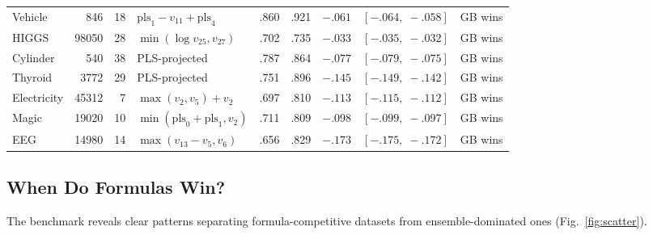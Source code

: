 \documentclass[journal]{IEEEtran}
\begin{document}
\begin{table}[t]
\begin{tabular}{@{}lrrlccrcl@{}}
Vehicle & 846 & 18 & $\mathrm{pls}_1 - v_{11} + \mathrm{pls}_4$ & .860 & .921 & $-.061$ & $[-.064,\; -.058]$ & GB wins \\
HIGGS & 98050 & 28 & $\min(\log v_{25}, v_{27})$ & .702 & .735 & $-.033$ & $[-.035,\; -.032]$ & GB wins \\
Cylinder & 540 & 38 & PLS-projected & .787 & .864 & $-.077$ & $[-.079,\; -.075]$ & GB wins \\
Thyroid & 3772 & 29 & PLS-projected & .751 & .896 & $-.145$ & $[-.149,\; -.142]$ & GB wins \\
Electricity & 45312 & 7 & $\max(v_2, v_5) + v_2$ & .697 & .810 & $-.113$ & $[-.115,\; -.112]$ & GB wins \\
Magic & 19020 & 10 & $\min(\mathrm{pls}_0 {+} \mathrm{pls}_1, v_2)$ & .711 & .809 & $-.098$ & $[-.099,\; -.097]$ & GB wins \\
EEG & 14980 & 14 & $\max(v_{13} - v_5, v_6)$ & .656 & .829 & $-.173$ & $[-.175,\; -.172]$ & GB wins \\
\bottomrule
\end{tabular}
\end{table}

\subsection{When Do Formulas Win?}
\label{sec:analysis}

The benchmark reveals clear patterns separating formula-competitive
datasets from ensemble-dominated ones (Fig.~\ref{fig:scatter}).
\end{document}
